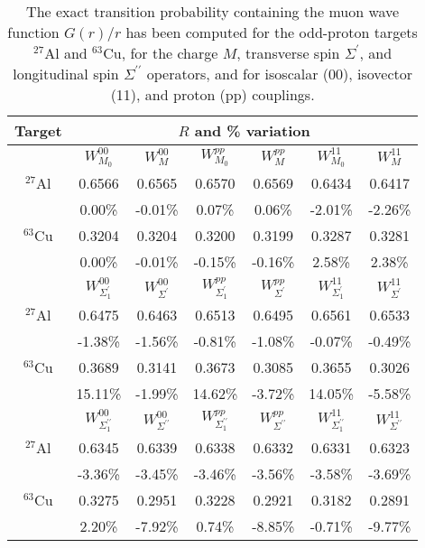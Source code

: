 \documentclass{book}[letterpaper,12pt]
\begin{document}
\begin{table}
\centering
 \begin{tabular}{ccccccc}
 \hline
 \hline
Target &  \multicolumn{5}{c}{~~~~~~~$R$ and \% variation}  & \\
\hline
 & $W_{M_0}^{00}$ & $W_M^{00}$ & $W_{M_0}^{pp}$ & $W_M^{pp}$ & $W_{M_0}^{11}$ & $W_M^{11}$ \\
 $^{27}$Al & 0.6566 & 0.6565 & 0.6570 & 0.6569  & 0.6434 & 0.6417  \\
  & 0.00\% & -0.01\% & 0.07\% & 0.06\% &  -2.01\% & -2.26\% \\
  $^{63}$Cu & 0.3204 & 0.3204 & 0.3200 & 0.3199 & 0.3287 & 0.3281  \\
  & 0.00\% & -0.01\% & -0.15\% & -0.16\%   & 2.58\% & 2.38\% \\[3mm]
 & $W_{\Sigma^\prime_1}^{00}$ & $W_{\Sigma^\prime}^{00}$ & $W_{\Sigma^\prime_1}^{pp}$ & $W_{\Sigma^\prime}^{pp}$ &  $W_{\Sigma^\prime_1}^{11}$ & $W_{\Sigma^\prime}^{11}$ \\
 $^{27}$Al & 0.6475 & 0.6463 & 0.6513 & 0.6495 & 0.6561 & 0.6533 \\
  & -1.38\% & -1.56\% & -0.81\% & -1.08\% &  -0.07\% & -0.49\% \\
  $^{63}$Cu & 0.3689 & 0.3141 & 0.3673 & 0.3085 &  0.3655 &  0.3026 \\
  & 15.11\% & -1.99\% & 14.62\% & -3.72\% & 14.05\% &  -5.58\% \\[3mm]
  & $W_{\Sigma^{\prime \prime}_1}^{00}$ & $W_{\Sigma^{\prime \prime}}^{00}$ & $W_{\Sigma^{\prime \prime}_1}^{pp}$ & $W_{\Sigma^{\prime \prime}}^{pp}$ & $W_{\Sigma^{\prime \prime}_1}^{11}$ & $W_{\Sigma^{\prime \prime}}^{11}$ \\
 $^{27}$Al & 0.6345 & 0.6339 & 0.6338 & 0.6332 &  0.6331 &  0.6323 \\
  & -3.36\% & -3.45\% & -3.46\% & -3.56\% & -3.58\% & -3.69\% \\
  $^{63}$Cu & 0.3275 & 0.2951 & 0.3228 & 0.2921 & 0.3182 & 0.2891  \\
  & 2.20\% & -7.92\% & 0.74\% & -8.85\% & -0.71\% & -9.77\% \\
  \hline
  \hline
 \end{tabular}
  \caption{ \label{tab:average1} The exact transition probability containing the muon wave function $G(r)/r$ has been computed for the odd-proton targets $^{27}$Al and $^{63}$Cu, for the charge $M$,
  transverse spin $\Sigma^\prime$, and longitudinal spin $\Sigma^{\prime \prime}$ operators, and for isoscalar (00), isovector (11), and proton (pp) couplings.
}
\end{table}
\end{document}
